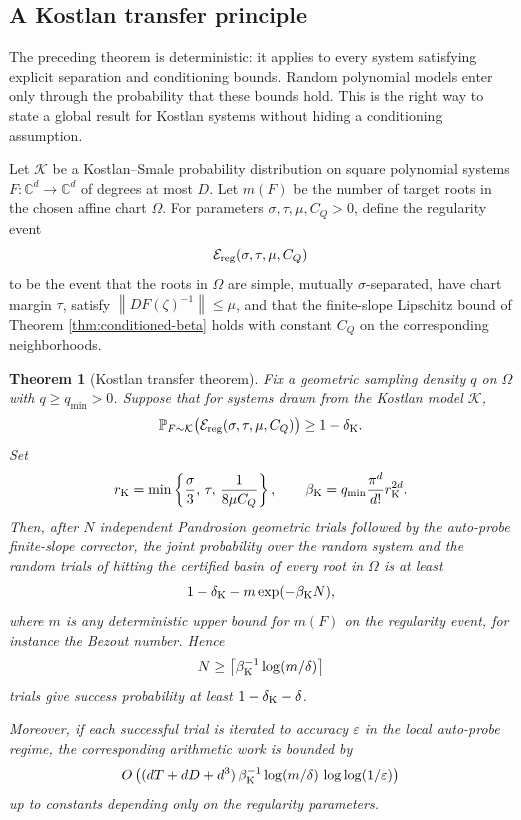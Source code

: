 \documentclass[11pt]{article}
\newtheorem{theorem}{Theorem}[section]
\theoremstyle{definition}
\theoremstyle{remark}
\newcommand{\C}{\mathbb{C}}
\newcommand{\norm}[1]{\left\lVert #1\right\rVert}
\begin{document}
\subsection{A Kostlan transfer principle}

The preceding theorem is deterministic: it applies to every system satisfying explicit separation and conditioning bounds.  Random polynomial models enter only through the probability that these bounds hold.  This is the right way to state a global result for Kostlan systems without hiding a conditioning assumption.

Let $\mathcal K$ be a Kostlan--Smale probability distribution on square polynomial systems $F:\C^d\to\C^d$ of degrees at most $D$.  Let $m(F)$ be the number of target roots in the chosen affine chart $\Omega$.  For parameters $\sigma,\tau,\mu,C_Q>0$, define the regularity event
\[
        \mathcal E_{\rm reg}(\sigma,\tau,\mu,C_Q)
\]
to be the event that the roots in $\Omega$ are simple, mutually $\sigma$-separated, have chart margin $\tau$, satisfy $\norm{DF(\zeta)^{-1}}\leq\mu$, and that the finite-slope Lipschitz bound of Theorem \ref{thm:conditioned-beta} holds with constant $C_Q$ on the corresponding neighborhoods.

\begin{theorem}[Kostlan transfer theorem]\label{thm:kostlan-transfer}
Fix a geometric sampling density $q$ on $\Omega$ with $q\geq q_{\min}>0$.  Suppose that for systems drawn from the Kostlan model $\mathcal K$,
\[
        \mathbb P_{F\sim\mathcal K}\bigl(\mathcal E_{\rm reg}(\sigma,\tau,\mu,C_Q)\bigr)
        \geq 1-\delta_{\rm K}.
\]
Set
\[
        r_{\rm K}=\min\left\{\frac{\sigma}{3},\,\tau,\,\frac{1}{8\mu C_Q}\right\},
        \qquad
        \beta_{\rm K}=q_{\min}\frac{\pi^d}{d!}r_{\rm K}^{2d}.
\]
Then, after $N$ independent Pandrosion geometric trials followed by the auto-probe finite-slope corrector, the joint probability over the random system and the random trials of hitting the certified basin of every root in $\Omega$ is at least
\begin{equation}\label{eq:kostlan-success}
        1-\delta_{\rm K}-m\exp(-\beta_{\rm K}N),
\end{equation}
where $m$ is any deterministic upper bound for $m(F)$ on the regularity event, for instance the Bezout number.  Hence
\begin{equation}\label{eq:kostlan-N}
        N\geq \left\lceil\beta_{\rm K}^{-1}\log(m/\delta)\right\rceil
\end{equation}
trials give success probability at least $1-\delta_{\rm K}-\delta$.

Moreover, if each successful trial is iterated to accuracy $\varepsilon$ in the local auto-probe regime, the corresponding arithmetic work is bounded by
\begin{equation}\label{eq:kostlan-work}
        O\left(
        (dT+dD+d^3)\,
        \beta_{\rm K}^{-1}\log(m/\delta)\,
        \log\log(1/\varepsilon)
        \right)
\end{equation}
up to constants depending only on the regularity parameters.
\end{theorem}
\end{document}
